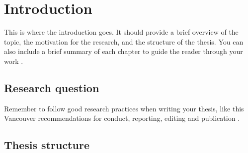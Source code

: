 \chapter{Introduction} \label{sec:introduction}

This is where the introduction goes. It should provide a brief overview of the topic, the motivation for the research,
and the structure of the thesis. You can also include a brief summary of each chapter to guide the reader through your
work \cite{biblatex}.

\section{Research question}

Remember to follow good research practices when writing your thesis, like this Vancouver recommendations for conduct,
reporting, editing and publication \cite{ICMJE2020vancouver}.

\section{Thesis structure}
